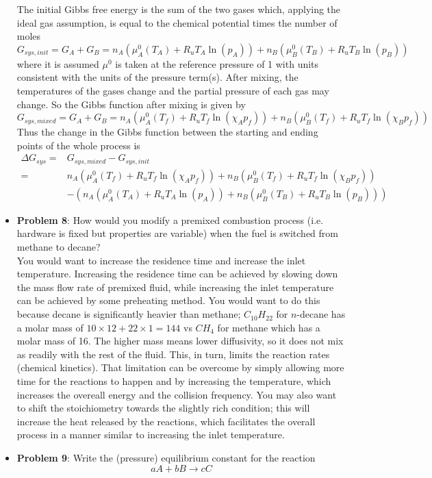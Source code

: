 \documentclass[11pt]{article}
\newcommand{\Item}[1]{\item \textbf{#1}:}
\newcommand{\Problem}[1]{\Item{Problem #1}}
\begin{document}
\begin{itemize}
The initial Gibbs free energy is the sum of the two gases which, applying the ideal gas assumption, is equal to the chemical potential times the number of moles
$$G_{sys,init} = G_A + G_B = n_A(\mu^0_A(T_A) + R_uT_A\ln(p_A)) + n_B(\mu^0_B(T_B)+R_uT_B\ln(p_B))$$
where it is assumed $\mu^0$ is taken at the reference pressure of 1 with units consistent with the units of the pressure term(s). After mixing, the temperatures of the gases change and the partial pressure of each gas may change. So the Gibbs function after mixing is given by
$$G_{sys,mixed} = G_A + G_B = n_A(\mu^0_A(T_f) + R_uT_f\ln(\chi_Ap_f)) + n_B(\mu^0_B(T_f) + R_uT_f\ln(\chi_Bp_f))$$
Thus the change in the Gibbs function between the starting and ending points of the whole process is
\begin{align*}
\Delta G_{sys} =& G_{sys,mixed} - G_{sys,init}\\
=& n_A(\mu^0_A(T_f) + R_uT_f\ln(\chi_Ap_f)) + n_B(\mu^0_B(T_f) + R_uT_f\ln(\chi_Bp_f))\\
&- \left(n_A(\mu^0_A(T_A) + R_uT_A\ln(p_A)) + n_B(\mu^0_B(T_B)+R_uT_B\ln(p_B))\right)
\end{align*} 

\Problem{8} How would you modify a premixed combustion process (i.e. hardware is fixed but properties are variable) when the fuel is switched from methane to decane?\\

You would want to increase the residence time and increase the inlet temperature. Increasing the residence time can be achieved by slowing down the mass flow rate of premixed fluid, while increasing the inlet temperature can be achieved by some preheating method. You would want to do this because decane is significantly heavier than methane; $C_{10}H_{22}$ for $n$-decane has a molar mass of $10\times12 + 22\times1 = 144$ vs $CH_4$ for methane which has a molar mass of 16. The higher mass means lower diffusivity, so it does not mix as readily with the rest of the fluid. This, in turn, limits the reaction rates (chemical kinetics). That limitation can be overcome by simply allowing more time for the reactions to happen and by increasing the temperature, which increases the overeall energy and the collision frequency. You may also want to shift the stoichiometry towards the slightly rich condition; this will increase the heat released by the reactions, which facilitates the overall process in a manner similar to increasing the inlet temperature.

\Problem{9} Write the (pressure) equilibrium constant for the reaction 
$$aA + bB \to cC$$


\end{itemize}
\end{document}
